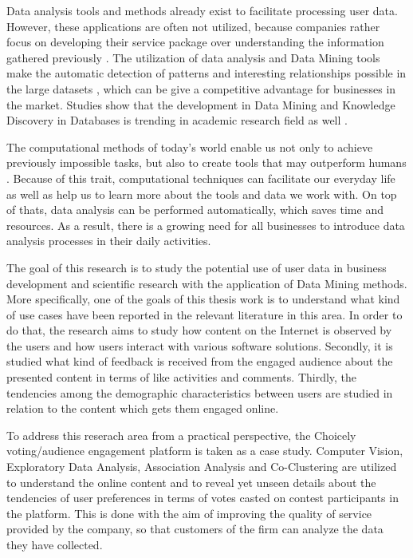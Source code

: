     Data analysis tools and methods already exist to facilitate processing user data. However, these applications are often not utilized, because companies rather focus on developing their service package over understanding the information gathered previously \cite{bigdatamanagementrevolution, inmon2007tapping}. The utilization of data analysis and Data Mining tools make the automatic detection of patterns and interesting relationships possible in the large datasets \cite{introtodatamining, Friedman97datamining}, which can be give a competitive advantage for businesses in the market. Studies show that the development in Data Mining and Knowledge Discovery in Databases is trending in academic research field as well \cite{bigdatamanagementrevolution, zarsky2002mine}.

    The computational methods of today's world enable us not only to achieve previously impossible tasks, but also to create tools that may outperform humans \cite{youyou2015computer}. Because of this trait, computational techniques can facilitate our everyday life as well as help us to learn more about the tools and data we work with. On top of thats, data analysis can be performed automatically, which saves time and resources. As a result, there is a growing need for all businesses to introduce data analysis processes in their daily activities.
    
    The goal of this research is to study the potential use of user data in business development and scientific research with the application of Data Mining methods. More specifically, one of the goals of this thesis work is to understand what kind of use cases have been reported in the relevant literature in this area. In order to do that, the research aims to study how content on the Internet is observed by the users and how users interact with various software solutions. Secondly, it is studied what kind of feedback is received from the engaged audience about the presented content in terms of like activities and comments. Thirdly, the tendencies among the demographic characteristics between users are studied in relation to the content which gets them engaged online.
    
    To address this reserach area from a practical perspective, the Choicely voting/audience engagement platform is taken as a case study. Computer Vision, Exploratory Data Analysis, Association Analysis and Co-Clustering are utilized to understand the online content and to reveal yet unseen details about the tendencies of user preferences in terms of votes casted on contest participants in the platform. This is done with the aim of improving the quality of service provided by the company, so that customers of the firm can analyze the data they have collected.
    
